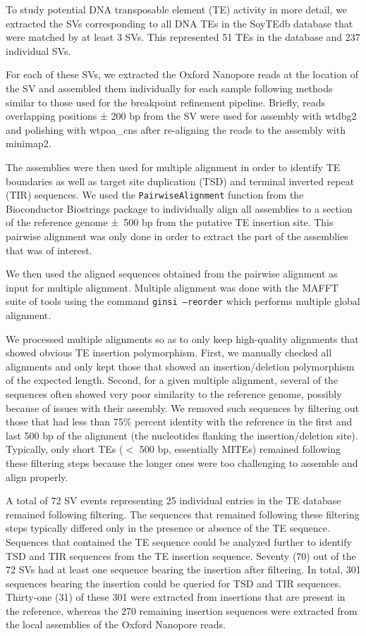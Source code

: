 \documentclass[12pt]{article}
\begin{document}
To study potential DNA transposable element (TE) activity in more detail, we extracted the SVs corresponding to all DNA TEs in the SoyTEdb database \citep{soytedb} that were matched by at least 3 SVs. 
This represented 51 TEs in the database and 237 individual SVs.

For each of these SVs, we extracted the Oxford Nanopore reads at the location of the SV and assembled them individually for each sample following methods similar to those used for the breakpoint refinement pipeline.
Briefly, reads overlapping positions ± 200 bp from the SV were used for assembly with wtdbg2 and polishing with wtpoa\_cns after re-aligning the reads to the assembly with minimap2.

The assemblies were then used for multiple alignment in order to identify TE boundaries as well as target site duplication (TSD) and terminal inverted repeat (TIR) sequences.
We used the \texttt{PairwiseAlignment} function from the Bioconductor Biostrings package \citep{biostrings} to individually align all assemblies to a section of the reference genome ±~500 bp from the putative TE insertion site.
This pairwise alignment was only done in order to extract the part of the assemblies that was of interest.

We then used the aligned sequences obtained from the pairwise alignment as input for multiple alignment.
Multiple alignment was done with the MAFFT \citep{mafft} suite of tools using the command \texttt{ginsi --reorder} which performs multiple global alignment.

We processed multiple alignments so as to only keep high-quality alignments that showed obvious TE insertion polymorphism.
First, we manually checked all alignments and only kept those that showed an insertion/deletion polymorphism of the expected length.
Second, for a given multiple alignment, several of the sequences often showed very poor similarity to the reference genome, possibly because of issues with their assembly.
We removed such sequences by filtering out those that had less than 75\% percent identity with the reference in the first and last 500 bp of the alignment (the nucleotides flanking the insertion/deletion site).
Typically, only short TEs ($<$ 500 bp, essentially MITEs) remained following these filtering steps because the longer ones were too challenging to assemble and align properly.

A total of 72 SV events representing 25 individual entries in the TE database remained following filtering.
The sequences that remained following these filtering steps typically differed only in the presence or absence of the TE sequence.
Sequences that contained the TE sequence could be analyzed further to identify TSD and TIR sequences from the TE insertion sequence.
Seventy (70) out of the 72 SVs had at least one sequence bearing the insertion after filtering.
In total, 301 sequences bearing the insertion could be queried for TSD and TIR sequences.
Thirty-one (31) of these 301 were extracted from insertions that are present in the reference, whereas the 270 remaining insertion sequences were extracted from the local assemblies of the Oxford Nanopore reads.
\end{document}
